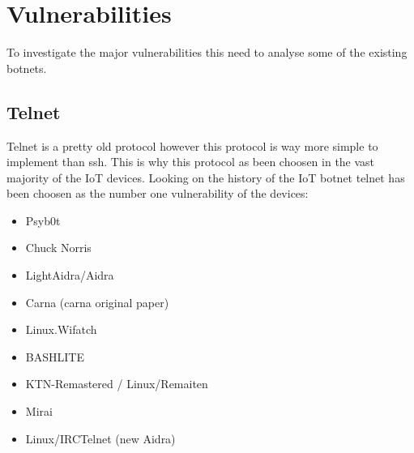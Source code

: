 \documentclass{report}
\begin{document}
\section{Vulnerabilities}
To investigate the major vulnerabilities this need to analyse some of the existing botnets.

\subsection{Telnet}
Telnet is a pretty old protocol\autocite{davidson1977arpanet} however this protocol is way more simple to implement than ssh. This is why this protocol as been choosen in the vast majority of the IoT devices. Looking on the history of the IoT botnet telnet has been choosen as the number one vulnerability of the devices:

\begin{itemize}
 \item Psyb0t\autocite{durfina2013psybot}
 \item Chuck Norris\autocite{celeda2010embedded}
 \item LightAidra/Aidra\autocite{aidra}
 \item Carna\autocite{krenc2014internet} (carna original paper\autocite{carna})
 \item Linux.Wifatch\autocite{wifatch}
 \item BASHLITE\autocite{bashlite}
 \item KTN-Remastered / Linux/Remaiten\autocite{remaiten}
 \item Mirai\autocite{kolias2017ddos}
 \item Linux/IRCTelnet (new Aidra)\autocite{irctelnet}
\end{itemize}
\end{document}
